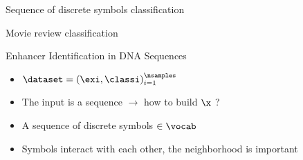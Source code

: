 
\newcommand{\cga}{{\color{red!70!black} A}}
\newcommand{\cgc}{{\color{blue!70!black} C}}
\newcommand{\cgg}{{\color{yellow!70!black} G}}
\newcommand{\cgt}{{\color{green!70!black} T}}

\begin{frame}{Sequence of discrete symbols classification }
  \begin{block}{Movie review classification}
    \begin{center}
    \end{center}
  \end{block}
  \begin{block}{Enhancer Identification in  DNA Sequences}
    \begin{center}
    \end{center}
  \end{block}
  \begin{itemize}
  \item $\dataset= (\exi , \classi )_{i=1}^{\nsamples}$ 
  \item The input is a sequence $\rightarrow$ how to build $\x$ ? 
  \item A sequence of discrete symbols $\in \vocab$
  \item Symbols  interact with each other, the neighborhood is important
  \end{itemize}
\end{frame}


